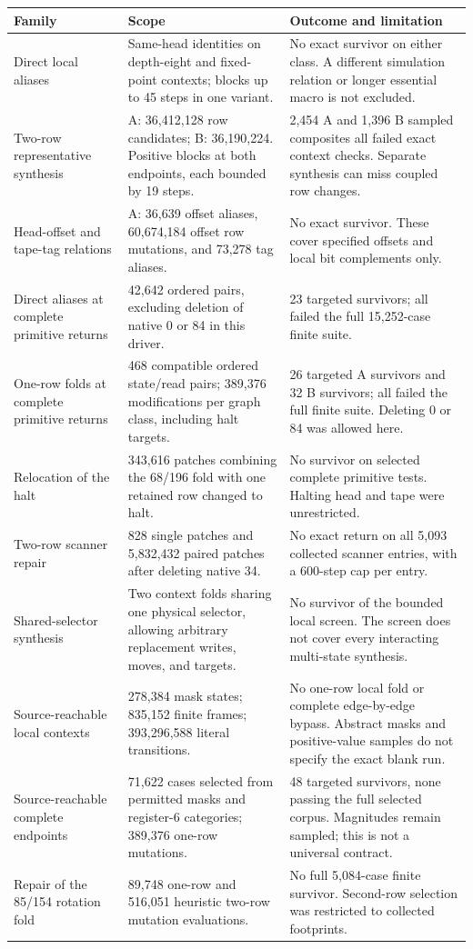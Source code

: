 \documentclass[11pt,a4paper]{article}
\theoremstyle{definition}
\begin{document}
\begin{longtable}{@{}P{0.25\textwidth}P{0.31\textwidth}P{0.36\textwidth}@{}}
\toprule
Family & Scope & Outcome and limitation\\
\midrule
\endhead
Direct local aliases & Same-head identities on depth-eight and fixed-point contexts; blocks up to 45 steps in one variant. & No exact survivor on either class. A different simulation relation or longer essential macro is not excluded.\\[0.6em]
Two-row representative synthesis & A: 36,412,128 row candidates; B: 36,190,224. Positive blocks at both endpoints, each bounded by 19 steps. & 2,454 A and 1,396 B sampled composites all failed exact context checks. Separate synthesis can miss coupled row changes.\\[0.6em]
Head-offset and tape-tag relations & A: 36,639 offset aliases, 60,674,184 offset row mutations, and 73,278 tag aliases. & No exact survivor. These cover specified offsets and local bit complements only.\\[0.6em]
Direct aliases at complete primitive returns & 42,642 ordered pairs, excluding deletion of native 0 or 84 in this driver. & 23 targeted survivors; all failed the full 15,252-case finite suite.\\[0.6em]
One-row folds at complete primitive returns & 468 compatible ordered state/read pairs; 389,376 modifications per graph class, including halt targets. & 26 targeted A survivors and 32 B survivors; all failed the full finite suite. Deleting 0 or 84 was allowed here.\\[0.6em]
Relocation of the halt & 343,616 patches combining the 68/196 fold with one retained row changed to halt. & No survivor on selected complete primitive tests. Halting head and tape were unrestricted.\\[0.6em]
Two-row scanner repair & 828 single patches and 5,832,432 paired patches after deleting native 34. & No exact return on all 5,093 collected scanner entries, with a 600-step cap per entry.\\[0.6em]
Shared-selector synthesis & Two context folds sharing one physical selector, allowing arbitrary replacement writes, moves, and targets. & No survivor of the bounded local screen. The screen does not cover every interacting multi-state synthesis.\\[0.6em]
Source-reachable local contexts & 278,384 mask states; 835,152 finite frames; 393,296,588 literal transitions. & No one-row local fold or complete edge-by-edge bypass. Abstract masks and positive-value samples do not specify the exact blank run.\\
Source-reachable complete endpoints & 71,622 cases selected from permitted masks and register-6 categories; 389,376 one-row mutations. & 48 targeted survivors, none passing the full selected corpus. Magnitudes remain sampled; this is not a universal contract.\\[0.6em]
Repair of the 85/154 rotation fold & 89,748 one-row and 516,051 heuristic two-row mutation evaluations. & No full 5,084-case finite survivor. Second-row selection was restricted to collected footprints.\\
\bottomrule
\end{longtable}
\end{document}

